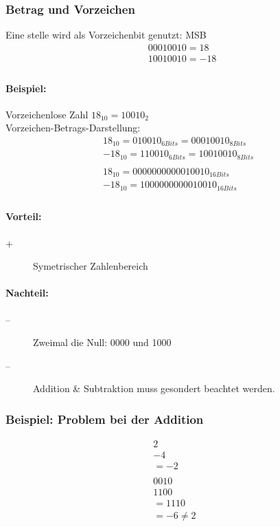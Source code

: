 \documentclass[a4paper]{scrartcl}
\begin{document}
				\subsubsection{Betrag und Vorzeichen}
					Eine stelle wird als Vorzeichenbit genutzt: MSB\\
					\begin{align*}
						&00010010 = 18\\
						&10010010 = -18\\
					\end{align*}
					
					
					\paragraph{Beispiel:}
					Vorzeichenlose Zahl \( 18_{10} =10010_2 \) \\
					Vorzeichen-Betrags-Darstellung: \\
					\begin{align*}
						18_{10} = 010010_{6Bits} = 0001 0010_{8 Bits} \\
						-18_{10} = 110010_{6Bits} = 1001 0010_{8Bits} \\
						\\
						18_{10} = 0000 0000 0001 0010_{16 Bits}\\
						-18_{10} = 1000 0000 0001 0010_{16Bits}\\	
					\end{align*}
										
					\paragraph{Vorteil:}
					\begin{description}
						\item[+] Symetrischer Zahlenbereich
					\end{description}
					
					\paragraph{Nachteil:}
						\begin{description}
							\item[--] 
								Zweimal die Null: 0000 und 1000
							\item[--] 
								Addition \& Subtraktion muss gesondert beachtet werden.
						\end{description}
					
				\subsubsection{Beispiel: Problem bei der Addition}
					\[
						\begin{aligned}
							2& \\
							-4& \\
							= -2& \\
							\\
							0010& \\
							1100&\\
							=1110& \\
							= -6 \neq 2&\\
						\end{aligned}
					\]
\end{document}
